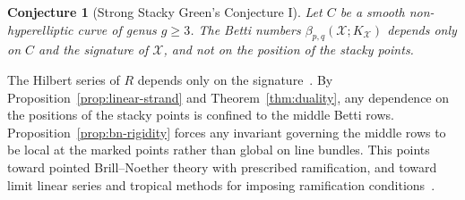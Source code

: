\documentclass[11pt,reqno]{amsart}
\newtheorem{conjecture}[lemma]{Conjecture}
\newtheorem{question}[lemma]{Question}
\theoremstyle{remark}
\newcommand{\FF}{\mathbb{F}}
\newcommand{\cX}{\mathcal{X}}
\begin{document}
\begin{conjecture}[Strong Stacky Green's Conjecture I]\label{conj:middle}
Let $C$ be a smooth non-hyperelliptic curve of genus $g\geq3$. The Betti numbers $\beta_{p,q}(\cX;K_{\cX})$ depends only on $C$ and the signature of $\cX$, and not on the position of the stacky points.
\end{conjecture}

%


The Hilbert series of $R$ depends only on the signature~\cite{voightZurieckBrown22}. By Proposition~\ref{prop:linear-strand} and Theorem~\ref{thm:duality}, any dependence on the positions of the stacky points is confined to the middle Betti rows. Proposition~\ref{prop:bn-rigidity} forces any invariant governing the middle rows to be local at the marked points rather than global on line bundles. This points toward pointed Brill--Noether theory with prescribed ramification, and toward limit linear series and tropical methods for imposing ramification conditions~\cite{p17,larson21,JR21,CPJ22,LLV25}.
\end{document}
